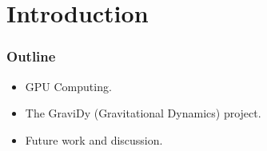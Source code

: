 \section{Introduction}

\begin{frame}
    \frametitle{Outline}
    \begin{itemize}
        \item GPU Computing.
        \item The GraviDy (Gravitational Dynamics) project.
        \item Future work and discussion.
    \end{itemize}
\end{frame}


%
%
%
%
